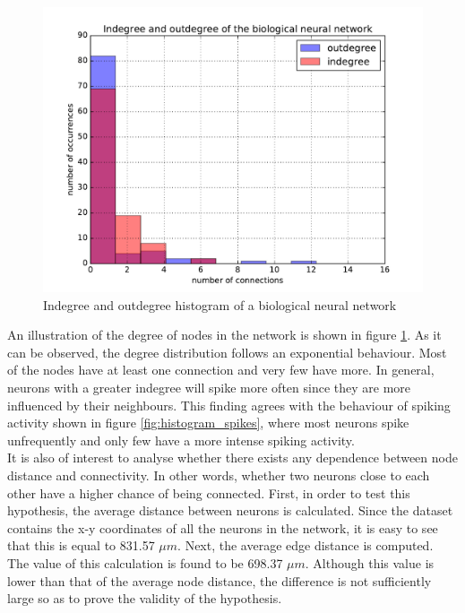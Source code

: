\begin{figure}
	\centering
	\includegraphics[width=0.8\linewidth]{degree_histogram_real_network.pdf}
	\caption{Indegree and outdegree histogram of a biological neural network}
	\label{fig:degree_histogram}
\end{figure}

An illustration of the degree of nodes in the network is shown in figure \ref{fig:degree_histogram}. As it can be observed, the degree distribution follows an exponential behaviour. Most of the nodes have at least one connection and very few have more. In general, neurons with a greater indegree will spike more often since they are more influenced by their neighbours. This finding agrees with the behaviour of spiking activity shown in figure \ref{fig:histogram_spikes}, where most neurons spike unfrequently and only few have a more intense spiking activity.\\

It is also of interest to analyse whether there exists any dependence between node distance and connectivity. In other words, whether two neurons close to each other have a higher chance of being connected. First, in order to test this hypothesis, the average distance between neurons is calculated. Since the dataset contains the x-y coordinates of all the neurons in the network, it is easy to see that this is equal to 831.57 \(\mu m\). Next, the average edge distance is computed. The value of this calculation is found to be 698.37 \(\mu m\). Although this value is lower than that of the average node distance, the difference is not sufficiently large so as to prove the validity of the hypothesis.








